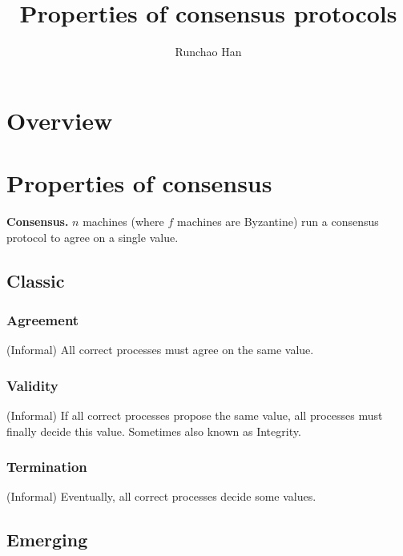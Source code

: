 \documentclass[runningheads]{llncs}
\begin{document}
\title{Properties of consensus protocols}

\author{Runchao Han}


\maketitle


\section{Overview}



\section{Properties of consensus}

\textbf{Consensus.}
$n$ machines (where $f$ machines are Byzantine) run a consensus protocol to agree on a single value.

\subsection{Classic}

\subsubsection{Agreement}
(Informal) All correct processes must agree on the same value.

\subsubsection{Validity}
(Informal) If all correct processes propose the same value, all processes must finally decide this value.
Sometimes also known as Integrity.

\subsubsection{Termination}
(Informal) Eventually, all correct processes decide some values.

\subsection{Emerging}
\end{document}
